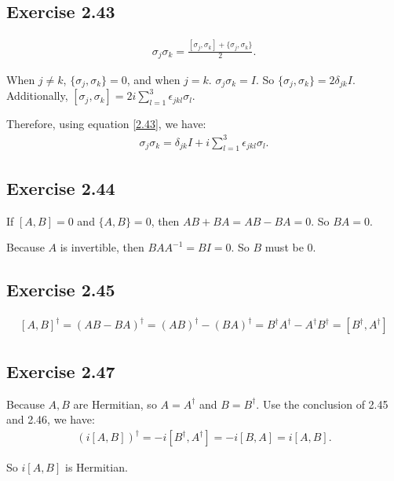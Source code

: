 \subsection*{Exercise 2.43}
\begin{align}
\sigma_j\sigma_k=\frac{[\sigma_j,\sigma_k]+\{\sigma_j,\sigma_k\}}{2}.
\label{2.43}
\end{align}

When $j\neq k$, $\{\sigma_j,\sigma_k\}=0$, and when $j=k$. $\sigma_j\sigma_k=I$. So $\{\sigma_j,\sigma_k\}=2\delta_{jk}I$. Additionally, $[\sigma_j,\sigma_k]=2i\sum_{l=1}^{3}\epsilon_{jkl}\sigma_l$.

Therefore, using equation \ref{2.43}, we have:
\begin{align}
\sigma_j\sigma_k=\delta_{jk}I+i\sum_{l=1}^{3}\epsilon_{jkl}\sigma_l.
\end{align}

\subsection*{Exercise 2.44}

If $[A,B]=0$ and $\{A,B\}=0$, then $AB+BA=AB-BA= 0$. So $BA = 0$.

Because $A$ is invertible, then $BAA^{-1}=BI=0$. So $B$ must be $0$. 

\subsection*{Exercise 2.45}
\begin{align}
\left[A,B\right]^\dagger  =(AB-BA)^\dagger=(AB)^\dagger-(BA)^\dagger = B^\dagger A^\dagger-A^\dagger B^\dagger = \left[B^\dagger ,A^\dagger \right]
\end{align}

\subsection*{Exercise 2.47}
Because $A,B$ are Hermitian, so $A=A^\dagger$ and $B=B^\dagger$. Use the conclusion of 2.45 and 2.46, we have:
\begin{align}
(i[A,B])^\dagger=-i[B^\dagger,A^\dagger]=-i[B,A]=i[A,B].
\end{align}

So $i[A,B]$ is Hermitian.

